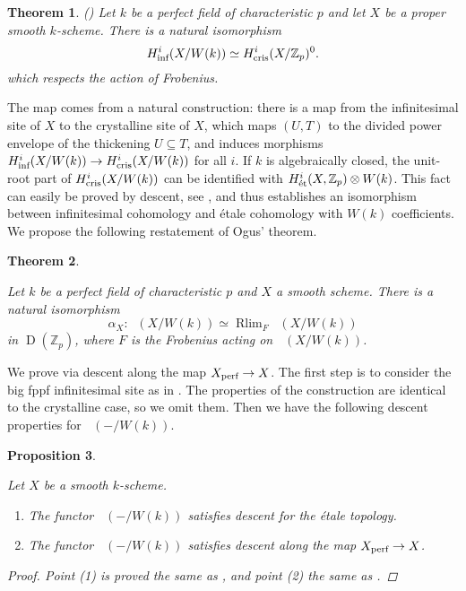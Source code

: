 \documentclass[11pt]{article}
\theoremstyle{plain}
\newtheorem{Thm}{Theorem}[subsection]
\newtheorem{Prop}[Thm]{Proposition}
\theoremstyle{definition}
\theoremstyle{remark}
\numberwithin{equation}{section}
\newenvironment{thm}[1]%
    { \begin{Thm} \label{T:#1}}%
    { \end{Thm} }
\renewcommand{\th}[1]{\begin{thm}{#1} \sl }
\renewcommand{\eth}{\end{thm} }
\newenvironment{propos}[1]%
    { \begin{Prop} \label{P:#1}}%
    { \end{Prop} }
\newcommand{\prop}[1]{\begin{propos}{#1}\sl }
\newcommand{\eprop}{\end{propos}}
\newcommand{\prf}{ \begin{proof} }
\newcommand{\epr}{ \end{proof} }
\newcommand{\Zp}{\mathbb{Z}_p}
\DeclareMathOperator{\D}{D}                                              %
\newcommand{\W}{W}                                                       %
\DeclareMathOperator{\Rlim}{Rlim}                                        %
\newcommand\Het[1]{H^{#1}_{\textnormal{\'{e}t}}}                         %
\newcommand\coperf[1]{#1_{\textnormal{perf}}}                            %
\DeclareMathOperator{\Rcris}{R\Gamma_{cris}}                             %
\newcommand\Hcris[1]{H^{#1}_{\textnormal{cris}}}                         %
\newcommand\Hinf[1]{H^{#1}_{\textnormal{inf}}}                         %
\DeclareMathOperator{\Rinf}{R\Gamma_{inf}}                             %
\begin{document}
\th{infogus}(\cite[Theorem 4.9]{ogusinf})
Let $k$ be a perfect field of characteristic $p$ and let $X$ be a proper smooth $k$-scheme. There is a natural isomorphism
\[
\Hinf{i}(X/\W(k))\simeq\Hcris{i}(X/\Zp)^0.
\]
which respects the action of Frobenius.
\eth

The map comes from a natural construction: there is a map from the infinitesimal site of $X$ to the crystalline site of $X$, which maps $(U,T)$ to the divided power envelope of the thickening $U\subseteq T$, and induces morphisms $\Hinf{i}(X/\W(k))\to\Hcris{i}(X/\W(k))$ for all $i$. If $k$ is algebraically closed, the unit-root part of $\Hcris{i}(X/\W(k))$ can be identified with $\Het{i}(X,\Zp)\otimes\W(k)$. This fact can easily be proved by descent, see , and  thus establishes an isomorphism between infinitesimal cohomology and étale cohomology with $\W(k)$ coefficients. We propose the following restatement of Ogus' theorem.

\th{infmio}

Let $k$ be a perfect field of characteristic $p$ and $X$ a smooth scheme. There is a natural isomorphism
\begin{equation}\label{isoinf}
\alpha_X:\Rinf(X/\W(k))\simeq\Rlim_F\Rcris(X/\W(k))
\end{equation}
in $\D(\Zp)$, where $F$ is the Frobenius acting on $\Rcris(X/\W(k))$.

\eth

We prove  via descent along the map $\coperf{X}\to X$. The first step is to consider the big fppf infinitesimal site as in . The properties of the construction are identical to the crystalline case, so we omit them. Then we have the following descent properties for $\Rinf(-/\W(k))$.

\prop{discesainf}

Let $X$ be a smooth $k$-scheme.
\begin{enumerate}
    \item The functor $\Rinf(-/\W(k))$ satisfies descent for the étale topology.
    \item The functor $\Rinf(-/\W(k))$ satisfies descent along the map $\coperf{X}\to X$.
\end{enumerate}

\prf
Point (1) is proved the same as , and point (2) the same as .
\epr

\eprop
\end{document}
